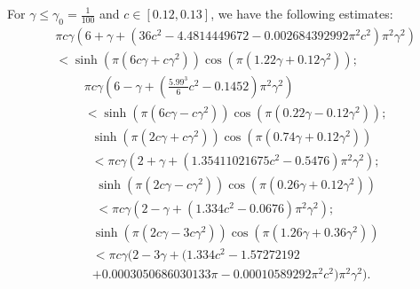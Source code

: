 \documentclass[10pt,a4paper]{amsart}
\begin{document}
\begin{lemma} \label{Lemmafive}
For $\gamma\leq\gamma_{0}=\frac{1}{100}$ and $c\in [0.12,0.13]$, 
we have the following estimates:
\begin{align} \label{identity1}
 &\pi c\gamma(6+\gamma+(36c^{2}-4.4814449672-0.002684392992\pi^{2}c^{2})\pi
^{2}\gamma^{2})\\\nonumber
&<\sinh(\pi(6c\gamma+c\gamma^{2}))\cos(\pi(1.22\gamma
+0.12\gamma^{2}));   
\end{align}
\begin{align}
  &\pi c\gamma(6-\gamma+(\frac{5.99^{3}}{6}c^{2}-0.1452)\pi^{2}\gamma^{2}%
)\\\nonumber
&<\sinh(\pi(6c\gamma-c\gamma^{2}))\cos(\pi(0.22\gamma-0.12\gamma^{2}));  
\end{align}
\begin{align} \label{identity3}
&\sinh(\pi(2c\gamma+c\gamma^{2}))\cos(\pi(0.74\gamma+0.12\gamma^{2}))\\\nonumber
&<\pi
c\gamma(2+\gamma+(1.35411021675c^{2}-0.5476)\pi^{2}\gamma^{2});
\end{align}
\begin{align}
&\sinh(\pi(2c\gamma-c\gamma^{2}))\cos(\pi(0.26\gamma+0.12\gamma^{2}))\\\nonumber
&<\pi
c\gamma(2-\gamma+(1.334c^{2}-0.0676)\pi^{2}\gamma^{2});
\end{align}
\begin{align}
& \sinh(\pi(2c\gamma-3c\gamma^{2}))\cos(\pi(1.26\gamma+0.36\gamma^{2}))\\\nonumber
&<\pi
c\gamma(2-3\gamma+(1.334c^{2}-1.57272192\\\nonumber
&+0.0003050686030133\pi
-0.00010589292\pi^{2}c^{2})\pi^{2}\gamma^{2}).  
\end{align}
\end{lemma}
\end{document}
